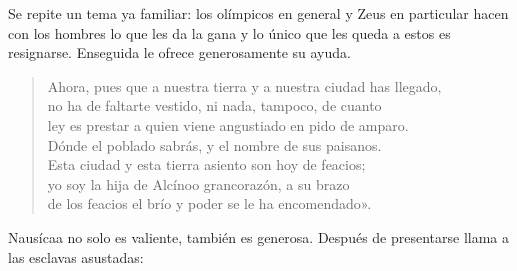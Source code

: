 Se repite un tema ya familiar: los olímpicos en general y Zeus en particular hacen con los hombres lo que les da la gana y lo único que les queda a estos es resignarse. Enseguida le ofrece generosamente su ayuda.

\begin{verse}
Ahora, pues que a nuestra tierra y a nuestra ciudad has llegado,\\
no ha de faltarte vestido, ni nada, tampoco, de cuanto\\
ley es prestar a quien viene angustiado en pido de amparo.\\
Dónde el poblado sabrás, y el nombre de sus paisanos.\\
Esta ciudad y esta tierra asiento son hoy de feacios;\\
yo soy la hija de Alcínoo grancorazón, a su brazo\\
de los feacios el brío y poder se le ha encomendado».
\end{verse}

%

Nausícaa no solo es valiente, también es generosa. Después de presentarse llama a las esclavas asustadas:

